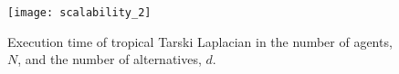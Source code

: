 \documentclass[letterpaper, 10 pt, conference]{ieeeconf}
\begin{document}
\begin{figure}
\centering
\texttt{[image: scalability\_2]}
\caption{Execution time of tropical Tarski Laplacian in the number of agents, $N$, and the number of alternatives, $d$.}
\label{fig:scalability}
\end{figure}





\appendix

    
\end{document}

